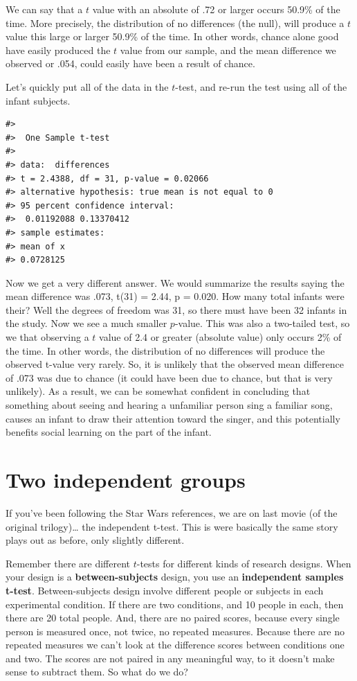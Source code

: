 \documentclass[
  letterpaper,
  DIV=11,
  numbers=noendperiod]{scrreprt}
\begin{document}
We can say that a \(t\) value with an absolute of .72 or larger occurs
50.9\% of the time. More precisely, the distribution of no differences
(the null), will produce a \(t\) value this large or larger 50.9\% of
the time. In other words, chance alone good have easily produced the
\(t\) value from our sample, and the mean difference we observed or
.054, could easily have been a result of chance.

Let's quickly put all of the data in the \(t\)-test, and re-run the test
using all of the infant subjects.

\begin{verbatim}
#> 
#>  One Sample t-test
#> 
#> data:  differences
#> t = 2.4388, df = 31, p-value = 0.02066
#> alternative hypothesis: true mean is not equal to 0
#> 95 percent confidence interval:
#>  0.01192088 0.13370412
#> sample estimates:
#> mean of x 
#> 0.0728125
\end{verbatim}

Now we get a very different answer. We would summarize the results
saying the mean difference was .073, t(31) = 2.44, p = 0.020. How many
total infants were their? Well the degrees of freedom was 31, so there
must have been 32 infants in the study. Now we see a much smaller
\(p\)-value. This was also a two-tailed test, so we that observing a
\(t\) value of 2.4 or greater (absolute value) only occurs 2\% of the
time. In other words, the distribution of no differences will produce
the observed t-value very rarely. So, it is unlikely that the observed
mean difference of .073 was due to chance (it could have been due to
chance, but that is very unlikely). As a result, we can be somewhat
confident in concluding that something about seeing and hearing a
unfamiliar person sing a familiar song, causes an infant to draw their
attention toward the singer, and this potentially benefits social
learning on the part of the infant.

\section{Two independent groups}\label{two-independent-groups}

If you've been following the Star Wars references, we are on last movie
(of the original trilogy)\ldots{} the independent t-test. This is were
basically the same story plays out as before, only slightly different.

Remember there are different \(t\)-tests for different kinds of research
designs. When your design is a \textbf{between-subjects} design, you use
an \textbf{independent samples t-test}. Between-subjects design involve
different people or subjects in each experimental condition. If there
are two conditions, and 10 people in each, then there are 20 total
people. And, there are no paired scores, because every single person is
measured once, not twice, no repeated measures. Because there are no
repeated measures we can't look at the difference scores between
conditions one and two. The scores are not paired in any meaningful way,
to it doesn't make sense to subtract them. So what do we do?
\end{document}
